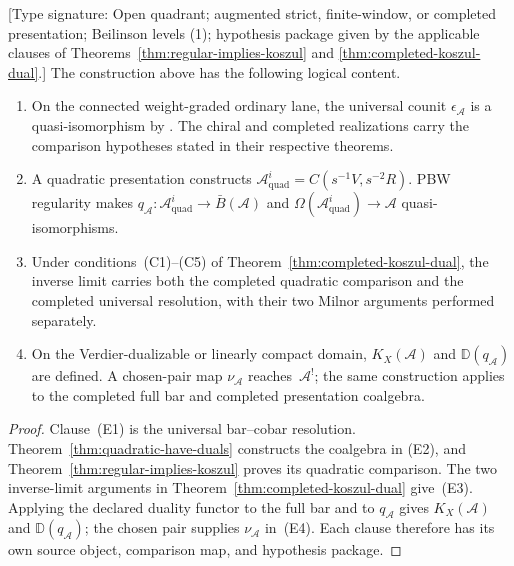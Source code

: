 \begin{proposition}
\label{prop:existence-test-correctness}
\textup{[Type signature: Open quadrant; augmented strict,
finite-window, or completed presentation; Beilinson levels
(1); hypothesis package given by the applicable
clauses of Theorems~\ref{thm:regular-implies-koszul} and
\ref{thm:completed-koszul-dual}.]}
The construction above has the following logical content.
\begin{enumerate}[label=\textup{(E\arabic*)}]
\item On the connected weight-graded ordinary lane, the universal
 counit $\epsilon_{\mathcal A}$ is a quasi-isomorphism by
 \cite[Corollary~2.3.4]{LV12}.  The chiral and completed realizations
 carry the comparison hypotheses stated in their respective theorems.
\item A quadratic presentation constructs
 $\mathcal A^i_{\mathrm{quad}}=C(s^{-1}V,s^{-2}R)$.  PBW regularity makes
 $q_{\mathcal A}\colon
 \mathcal A^i_{\mathrm{quad}}\longrightarrow\bar B(\mathcal A)$
 and $\Omega(\mathcal A^i_{\mathrm{quad}})\to\mathcal A$
 quasi-isomorphisms.
\item Under conditions~\textup{(C1)--(C5)} of
 Theorem~\ref{thm:completed-koszul-dual}, the inverse limit carries
 both the completed quadratic comparison and the completed universal
 resolution, with their two Milnor arguments performed separately.
\item On the Verdier-dualizable or linearly compact domain,
 $K_X(\mathcal A)$ and $\mathbb D(q_{\mathcal A})$ are defined.
 A chosen-pair map $\nu_{\mathcal A}$ reaches~$\mathcal A^!$; the
 same construction applies to the completed full bar and completed
 presentation coalgebra.
\end{enumerate}
\end{proposition}

\begin{proof}
Clause~\textup{(E1)} is the universal bar--cobar resolution.
Theorem~\ref{thm:quadratic-have-duals} constructs the coalgebra in
\textup{(E2)}, and Theorem~\ref{thm:regular-implies-koszul} proves its
quadratic comparison.  The two inverse-limit arguments in
Theorem~\ref{thm:completed-koszul-dual} give~\textup{(E3)}.
Applying the declared duality functor to the full bar and to
$q_{\mathcal A}$ gives $K_X(\mathcal A)$ and
$\mathbb D(q_{\mathcal A})$; the chosen pair supplies
$\nu_{\mathcal A}$ in~\textup{(E4)}.  Each clause therefore has its own source object,
comparison map, and hypothesis package.
\end{proof}

